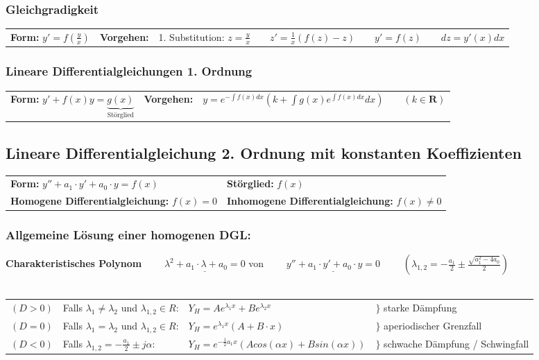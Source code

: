 \subsubsection{Gleichgradigkeit}
\begin{tabular}{p{4cm}p{1.5cm}p{15cm}}
\textbf{Form:} $y'=f(\frac{y}{x})$ &
\textbf{Vorgehen:}                &
1. Substitution: $z=\frac{y}{x} \qquad
z'=\frac{1}{x}(f(z)-z) \qquad
y'=f(z) \qquad
dz=y'(x)dx$ 
\end{tabular}

\subsubsection{Lineare Differentialgleichungen 1. Ordnung }
\begin{tabular}{p{4.5cm}p{1.5cm}p{10.5cm}}
\textbf{Form:} $ y'+f(x)y = \underbrace{g(x)}_{\text{Störglied}} $ &
\textbf{Vorgehen:}                 &
$ y=e^{-\int f(x) dx}(k+\int g(x)e^{\int f(x)dx}dx) \qquad (k\in\mathbf{R})$
\end{tabular}

\subsection{Lineare Differentialgleichung 2. Ordnung mit konstanten Koeffizienten }
\begin{tabular}{p{8cm}p{8cm}}
\textbf{Form:} $y''+a_1\cdot y'+a_0\cdot y=f(x)$  &
\textbf{Störglied:} $f(x)$\\
\textbf{Homogene Differentialgleichung:} $f(x)=0$ &
\textbf{Inhomogene Differentialgleichung:} $f(x)\neq 0$
\end{tabular}

\subsubsection{Allgemeine Lösung einer homogenen DGL:\quad{}}
\textbf{Charakteristisches Polynom}
$\qquad\underline{\lambda^2+a_1\cdot\lambda+a_0=0}$ \hspace{1cm}von
$\qquad\underline{y''+a_1\cdot y'+a_0\cdot y=0}$ 
$\qquad(\lambda_{1,2} = -\frac{a_1}{2} \pm \frac{\sqrt{a_1^2 - 4a_0}}{2})$\\ \\

\begin{tabular}{p{2cm}p{5cm}p{6cm}p{4cm}}
$(D > 0)$ &
Falls $\lambda_1\neq \lambda_2$ und $\lambda_{1,2} \in R$: &
$Y_H=Ae^{\lambda_1x}+Be^{\lambda_2x}$ & 
$\rbrace$ starke Dämpfung\\

$(D = 0)$ &
Falls $\lambda_1=\lambda_2$ und $\lambda_{1,2} \in R$: &
$Y_H=e^{\lambda_1x}(A+B\cdot x)$ & 
$\rbrace$ aperiodischer Grenzfall\\

$(D < 0)$ &
Falls $\lambda_{1,2}=-\frac{a_1}{2}\pm j\alpha$: &
$Y_H=e^{-\frac{1}{2}a_1x}(Acos(\alpha x) +Bsin(\alpha x))$ &
$\rbrace$ schwache Dämpfung / Schwingfall \\
\end{tabular}

